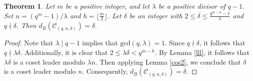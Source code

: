\documentclass[journal,onecolumn]{IEEEtran}
\newtheorem{theorem}{Theorem}
\begin{document}
\begin{theorem}\label{th5}
    Let $m$ be a positive integer, and let $\lambda$ be a positive divisor of $q-1$. Set $n=(q^{m}-1)/\lambda$ and $h=\lfloor \frac{m}{2}\rfloor$. Let $\delta$ be an integer with   $2\leq \delta\leq \frac{q^{m-h}-1}{\lambda}$ and $q\nmid \delta$.    Then     $d_B(\mathcal{C}_{(q,n,\delta)})=\delta.$
\end{theorem}
\begin{proof}

    Note that $\lambda \mid q-1$ implies that $\mathrm{gcd}(q,\lambda)=1$. Since $q\nmid \delta$, it follows that $q\nmid \lambda\delta$. Additionally, it is clear that $2\leq \lambda\delta<q^{m-h}$.   By Lemma \ref{lll}, it follows that $\lambda \delta$ is  a coset leader modulo $\lambda n$. Then applying Lemma \ref{cos2}, we conclude that $\delta$ is  a coset leader modulo $n$. Consequently, $d_B(\mathcal{C}_{(q,n,\delta)})=\delta.$ 
\end{proof}
\end{document}
